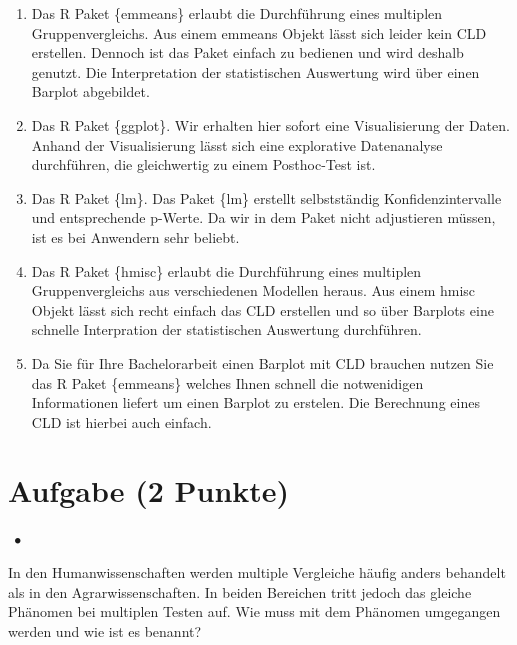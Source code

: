 \documentclass[a4paper, 9pt]{scrartcl}\usepackage[]{graphicx}\usepackage[]{xcolor}
\begin{document}
\begin{enumerate}
\item [\textbf{A} \msquare] Das R Paket \{emmeans\} erlaubt die Durchführung eines multiplen Gruppenvergleichs. Aus einem emmeans Objekt lässt sich leider kein CLD erstellen. Dennoch ist das Paket einfach zu bedienen und wird deshalb genutzt. Die Interpretation der statistischen Auswertung wird über einen Barplot abgebildet.
\item [\textbf{B} \msquare] Das R Paket \{ggplot\}. Wir erhalten hier sofort eine Visualisierung der Daten. Anhand der Visualisierung lässt sich eine explorative Datenanalyse durchführen, die gleichwertig zu einem Posthoc-Test ist.
\item [\textbf{C} \msquare] Das R Paket \{lm\}. Das Paket \{lm\} erstellt selbstständig Konfidenzintervalle und entsprechende p-Werte. Da wir in dem Paket nicht adjustieren müssen, ist es bei Anwendern sehr beliebt.
\item [\textbf{D} \msquare] Das R Paket \{hmisc\} erlaubt die Durchführung eines multiplen Gruppenvergleichs aus verschiedenen Modellen heraus. Aus einem hmisc Objekt lässt sich recht einfach das CLD erstellen und so über Barplots eine schnelle Interpration der statistischen Auswertung durchführen.
\item [\textbf{E} \msquare] Da Sie für Ihre Bachelorarbeit einen Barplot mit CLD brauchen nutzen Sie das R Paket \{emmeans\} welches Ihnen schnell die notwenidigen Informationen liefert um einen Barplot zu erstelen. Die Berechnung eines CLD ist hierbei auch einfach.
\end{enumerate}

\section{Aufgabe \hfill (2 Punkte)}

\ifcollection
\begin{flushright}
\tiny\vspace{-2Ex}
\textbf{\examinhaltstart}
\exammodulestatversuch $\;\bullet$
\exammodulebiostat
\vspace{-1Ex}
\end{flushright}
\fi




In den Humanwissenschaften werden multiple Vergleiche häufig anders behandelt als in den Agrarwissenschaften. In beiden Bereichen tritt jedoch das gleiche Phänomen bei multiplen Testen auf. Wie muss mit dem Phänomen umgegangen werden und wie ist es benannt?
\end{document}
